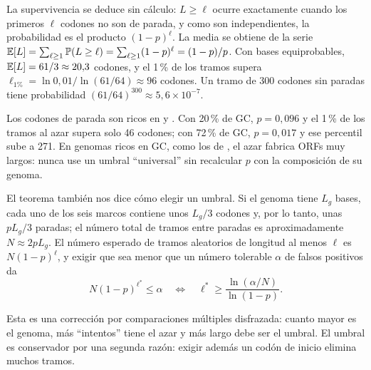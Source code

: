 La supervivencia se deduce sin cálculo: $L\ge\ell$ ocurre exactamente cuando los primeros $\ell$ codones no son de parada, y como son independientes, la probabilidad es el producto $(1-p)^\ell$. La media se obtiene de la serie $\mathbb{E}[L]=\sum_{\ell\ge1}\mathbb{P}(L\ge\ell)=\sum_{\ell\ge1}(1-p)^\ell=(1-p)/p$. Con bases equiprobables, $\mathbb{E}[L]=61/3\approx 20{,}3$ codones, y el 1\,\% de los tramos supera $\ell_{1\%}=\ln 0{,}01/\ln(61/64)\approx 96$ codones. Un tramo de 300 codones sin paradas tiene probabilidad $(61/64)^{300}\approx 5{,}6\times10^{-7}$.

\begin{cuidado}
Los codones de parada son ricos en  y . Con 20\,\% de GC, $p=0{,}096$ y el 1\,\% de los tramos al azar supera solo 46 codones; con 72\,\% de GC, $p=0{,}017$ y ese percentil sube a 271. En genomas ricos en GC, como los de , el azar fabrica ORFs muy largos: nunca use un umbral ``universal'' sin recalcular $p$ con la composición de su genoma.
\end{cuidado}

El teorema también nos dice cómo elegir un umbral. Si el genoma tiene $L_g$ bases, cada uno de los seis marcos contiene unos $L_g/3$ codones y, por lo tanto, unas $pL_g/3$ paradas; el número total de tramos entre paradas es aproximadamente $N\approx 2pL_g$. El número esperado de tramos aleatorios de longitud al menos $\ell$ es $N(1-p)^\ell$, y exigir que sea menor que un número tolerable $\alpha$ de falsos positivos da
\begin{equation}\label{eq:01-umbral}
N(1-p)^{\ell^*}\le\alpha
\quad\Longleftrightarrow\quad
\ell^* \ge \frac{\ln(\alpha/N)}{\ln(1-p)} .
\end{equation}

\begin{simbolos}
\end{simbolos}

Esta es una corrección por comparaciones múltiples disfrazada: cuanto mayor es el genoma, más ``intentos'' tiene el azar y más largo debe ser el umbral. El umbral es conservador por una segunda razón: exigir además un codón de inicio elimina muchos tramos.

